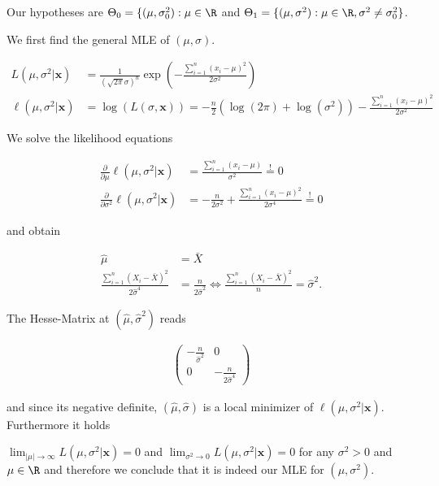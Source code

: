 \begin{solution}

Our hypotheses are $\Theta_0 = \{(\mu, \sigma_0^2): \mu \in \R$ and
$\Theta_1 = \{(\mu, \sigma^2): \mu \in \R, \sigma^2 \neq \sigma_0^2\}$.

We first find the general MLE of $(\mu, \sigma)$.

\begin{align*}
  L(\mu, \sigma^2 | \textbf{x}) &= \frac{1}{(\sqrt{2\pi}\sigma)^n}\exp\left(-\frac{\sum_{i=1}^n (x_i - \mu)^2}{2\sigma^2}\right) \\
  \ell(\mu, \sigma^2 | \textbf{x}) &= \log(L(\sigma,\textbf{x})) 
  = -\frac{n}{2}(\log(2\pi) + \log(\sigma^2)) - \frac{\sum_{i=1}^n (x_i - \mu)^2}{2\sigma^2}
\end{align*}

We solve the likelihood equations

\begin{align*}
  \frac{\partial}{\partial \mu} \ell(\mu, \sigma^2 | \textbf{x})
  &= \frac{\sum_{i=1}^n (x_i - \mu)}{\sigma^2} \stackrel{!}{=} 0 \\
  \frac{\partial}{\partial \sigma^2} \ell(\mu, \sigma^2 | \textbf{x})
  &= -\frac{n}{2\sigma^2} + \frac{\sum_{i=1}^n (x_i - \mu)^2}{2\sigma^4}
  \stackrel{!}{=} 0
\end{align*}

and obtain

\begin{align*}
  \hat{\mu} &= \bar{X} \\
  \frac{\sum_{i=1}^n (X_i - \bar{X})^2}{2\hat{\sigma}^4} &= \frac{n}{2\hat{\sigma}^2}
  \iff \frac{\sum_{i=1}^n (X_i - \bar{X})^2}{n} = \hat{\sigma}^2.
\end{align*}

The Hesse-Matrix at $(\hat{\mu}, \hat{\sigma}^2)$ reads

\begin{align*}
  \begin{pmatrix}
    -\frac{n}{\hat{\sigma}^2} & 0 \\
    0 & - \frac{n}{2\hat{\sigma}^4}
  \end{pmatrix}
\end{align*}

and since its negative definite, $(\hat{\mu},\hat{\sigma})$ is a local
minimizer of $\ell(\mu,\sigma^2 | \textbf{x})$.
Furthermore it holds 

$\lim_{|\mu| \to \infty} L(\mu, \sigma^2 | \textbf{x}) = 0$
and $\lim_{\sigma^2 \to 0} L(\mu, \sigma^2 | \textbf{x}) = 0$ for any $\sigma^2 > 0$ and $\mu \in \R$
and therefore we conclude that it is indeed our MLE for $(\mu,\sigma^2)$.



\end{solution}
